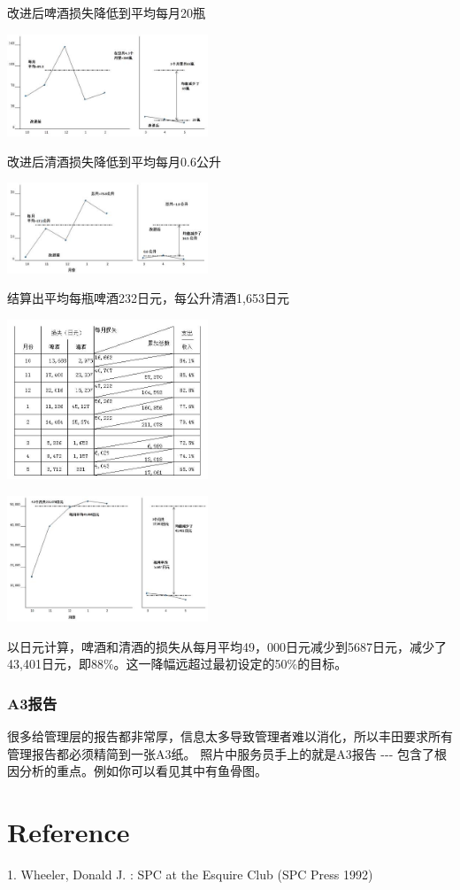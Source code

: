 改进后啤酒损失降低到平均每月20瓶


\includegraphics[width=6cm]{club201.jpg}

改进后清酒损失降低到平均每月0.6公升


\includegraphics[width=6cm]{club202.jpg}

结算出平均每瓶啤酒232日元，每公升清酒1,653日元


\includegraphics[width=6cm]{club211.jpg}


\includegraphics[width=6cm]{club221.jpg}

以日元计算，啤酒和清酒的损失从每月平均49，000日元减少到5687日元，减少了43,401日元，即88\%。这一降幅远超过最初设定的50\%的目标。

\hypertarget{a3ux62a5ux544a}{%
\subsubsection{A3报告}\label{a3ux62a5ux544a}}

很多给管理层的报告都非常厚，信息太多导致管理者难以消化，所以丰田要求所有管理报告都必须精简到一张A3纸。
照片中服务员手上的就是A3报告 -\/-\/-
包含了根因分析的重点。例如你可以看见其中有鱼骨图。

\hypertarget{reference}{%
\section{Reference}\label{reference}}

1. Wheeler, Donald J. : SPC at the Esquire Club (SPC Press 1992)

